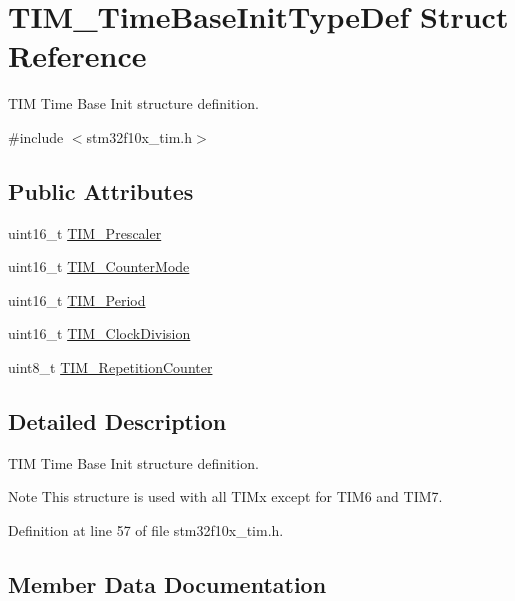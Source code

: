 \hypertarget{struct_t_i_m___time_base_init_type_def}{}\section{T\+I\+M\+\_\+\+Time\+Base\+Init\+Type\+Def Struct Reference}
\label{struct_t_i_m___time_base_init_type_def}


T\+IM Time Base Init structure definition.  




{\ttfamily \#include $<$stm32f10x\+\_\+tim.\+h$>$}

\subsection*{Public Attributes}
\begin{DoxyCompactItemize}
\item 
uint16\+\_\+t \hyperlink{struct_t_i_m___time_base_init_type_def_a6d3c8632780db819b2eb811e71ce251e}{T\+I\+M\+\_\+\+Prescaler}
\item 
uint16\+\_\+t \hyperlink{struct_t_i_m___time_base_init_type_def_a0de4138cd939566bc667f21df089e195}{T\+I\+M\+\_\+\+Counter\+Mode}
\item 
uint16\+\_\+t \hyperlink{struct_t_i_m___time_base_init_type_def_aeb5b90dc8f8a1ab85584e732789b2ee4}{T\+I\+M\+\_\+\+Period}
\item 
uint16\+\_\+t \hyperlink{struct_t_i_m___time_base_init_type_def_ab473f51adaa9474702e454fc8c24a407}{T\+I\+M\+\_\+\+Clock\+Division}
\item 
uint8\+\_\+t \hyperlink{struct_t_i_m___time_base_init_type_def_a81648259851390e090e1f507dfea7de8}{T\+I\+M\+\_\+\+Repetition\+Counter}
\end{DoxyCompactItemize}


\subsection{Detailed Description}
T\+IM Time Base Init structure definition. 

\begin{DoxyNote}{Note}
This structure is used with all T\+I\+Mx except for T\+I\+M6 and T\+I\+M7. 
\end{DoxyNote}


Definition at line 57 of file stm32f10x\+\_\+tim.\+h.



\subsection{Member Data Documentation}
\mbox{\label{struct_t_i_m___time_base_init_type_def_ab473f51adaa9474702e454fc8c24a407}} 
